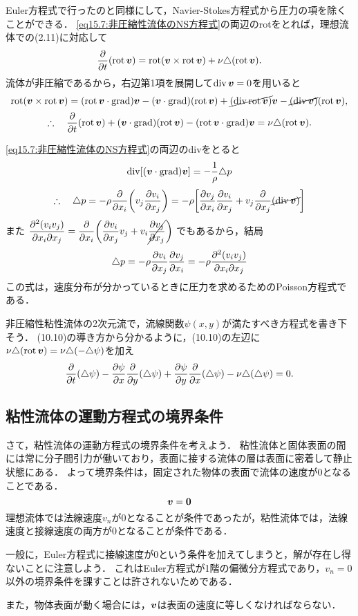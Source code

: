 Euler方程式で行ったのと同様にして，Navier-Stokes方程式から圧力の項を除くことができる．
\eqref{eq15.7:非圧縮性流体のNS方程式}の両辺のrotをとれば，理想流体での(2.11)に対応して
\[
    \pdv{t}(\operatorname{rot}\vb*{v}) = \operatorname{rot}(\vb*{v} \times \operatorname{rot}\vb*{v}) + \nu\triangle(\operatorname{rot}\vb*{v}) .
\]
流体が非圧縮であるから，右辺第1項を展開して$\operatorname{div}\vb*{v}=0$を用いると
\[
    \operatorname{rot}(\vb*{v} \times \operatorname{rot}\vb*{v})
    = (\operatorname{rot}\vb*{v} \cdot \operatorname{grad})\vb*{v} - (\vb*{v}\cdot\operatorname{grad})(\operatorname{rot}\vb*{v}) + \cancel{(\operatorname{div}\operatorname{rot}\vb*{v})} \vb*{v} - \cancel{(\operatorname{div}\vb*{v})} (\operatorname{rot}\vb*{v}) ,
\]
\begin{equation}
    \therefore\quad \pdv{t}(\operatorname{rot}\vb*{v}) + (\vb*{v}\cdot\operatorname{grad})(\operatorname{rot}\vb*{v}) - (\operatorname{rot}\vb*{v} \cdot \operatorname{grad})\vb*{v} = \nu\triangle(\operatorname{rot}\vb*{v}) .
\end{equation}

\spade
\eqref{eq15.7:非圧縮性流体のNS方程式}の両辺のdivをとると
\[
    \operatorname{div}[ (\vb*{v}\cdot\operatorname{grad})\vb*{v} ] = -\frac{1}{\rho} \triangle p
\]
\[
    \yueni \Laplacian p = -\rho \pdv{x_i} \pqty{ v_j \pdv{v_i}{x_j} }
    = -\rho \bqty{ \pdv{v_j}{x_i} \pdv{v_i}{x_j} + v_j \pdv{x_j} \cancel{(\Div\v)} }
\]
また
$ \dpdv{(v_iv_j)}{x_i}{x_j} = \dpdv{x_i} \pqty{ \dpdv{v_i}{x_j} v_j + v_i \cancel{\dpdv{v_j}{x_j}} } $
でもあるから，結局
\begin{equation}
    \triangle p = -\rho \pdv{v_i}{x_j} \pdv{v_j}{x_i} = -\rho \pdv{(v_iv_j)}{x_i}{x_j}
\end{equation}
この式は，速度分布が分かっているときに圧力を求めるためのPoisson方程式である．



非圧縮性粘性流体の2次元流で，流線関数$\psi(x,y)$が満たすべき方程式を書き下そう．
(10.10)の導き方から分かるように，(10.10)の左辺に$\nu\triangle(\operatorname{rot}\vb*{v})=\nu\triangle(-\triangle\psi)$を加え
\begin{equation}
    \pdv{t}(\triangle\psi) - \pdv{\psi}{x} \pdv{y}(\triangle\psi) + \pdv{\psi}{y} \pdv{x}(\triangle\psi) -\nu\triangle(\triangle\psi) = 0 .
\end{equation}


\subsection*{粘性流体の運動方程式の境界条件}

さて，粘性流体の運動方程式の境界条件を考えよう．
粘性流体と固体表面の間には常に分子間引力が働いており，表面に接する流体の層は表面に密着して静止状態にある．
よって境界条件は，固定された物体の表面で流体の速度が0となることである．
\begin{equation}
    \vb*{v} = \vb*{0}
\end{equation}
理想流体では法線速度$v_n$が0となることが条件であったが，粘性流体では，法線速度と接線速度の両方が0となることが条件である．
\begin{details}
一般に，Euler方程式に接線速度が0という条件を加えてしまうと，解が存在し得ないことに注意しよう．
これはEuler方程式が1階の偏微分方程式であり，$v_n=0$以外の境界条件を課すことは許されないためである．
\end{details}
\noindent
また，物体表面が動く場合には，$\vb*{v}$は表面の速度に等しくなければならない．



